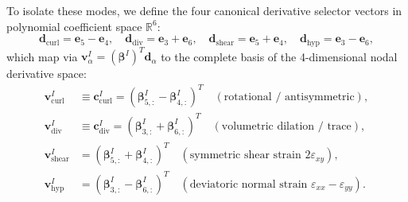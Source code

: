 \documentclass[VANCOUVER,Times1COL]{WileyNJD-v5}
\begin{document}
To isolate these modes, we define the four canonical derivative selector vectors in polynomial coefficient space $\mathbb{R}^6$:
\begin{equation}
    \mathbf{d}_{\mathrm{curl}} = \mathbf{e}_5 - \mathbf{e}_4, \quad
    \mathbf{d}_{\mathrm{div}} = \mathbf{e}_3 + \mathbf{e}_6, \quad
    \mathbf{d}_{\mathrm{shear}} = \mathbf{e}_5 + \mathbf{e}_4, \quad
    \mathbf{d}_{\mathrm{hyp}} = \mathbf{e}_3 - \mathbf{e}_6,
    \label{eq:canonical_d_vectors}
\end{equation}
which map via $\mathbf{v}_\alpha^I = (\boldsymbol{\beta}^I)^T \mathbf{d}_\alpha$ to the complete basis of the 4-dimensional nodal derivative space:
\begin{align}
    \mathbf{v}_{\mathrm{curl}}^I  & \equiv \mathbf{c}_{\mathrm{curl}}^I = (\boldsymbol{\beta}_{5, :}^I - \boldsymbol{\beta}_{4, :}^I)^T \quad (\text{rotational / antisymmetric}), \label{eq:v_curl_def}                   \\
    \mathbf{v}_{\mathrm{div}}^I   & \equiv \mathbf{c}_{\mathrm{div}}^I = (\boldsymbol{\beta}_{3, :}^I + \boldsymbol{\beta}_{6, :}^I)^T \quad (\text{volumetric dilation / trace}), \label{eq:v_div_def}                     \\
    \mathbf{v}_{\mathrm{shear}}^I & = (\boldsymbol{\beta}_{5, :}^I + \boldsymbol{\beta}_{4, :}^I)^T \quad (\text{symmetric shear strain } 2\varepsilon_{xy}), \label{eq:v_shear_def}                   \\
    \mathbf{v}_{\mathrm{hyp}}^I   & = (\boldsymbol{\beta}_{3, :}^I - \boldsymbol{\beta}_{6, :}^I)^T \quad (\text{deviatoric normal strain } \varepsilon_{xx} - \varepsilon_{yy}). \label{eq:v_hyp_def}
\end{align}
\end{document}
